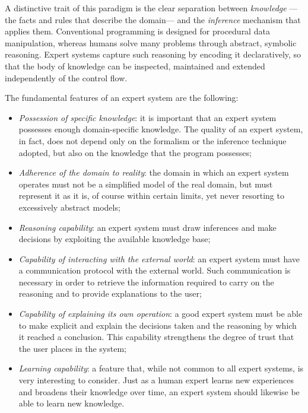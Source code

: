 A distinctive trait of this paradigm is the clear separation between
\emph{knowledge} ---the facts and rules that describe the domain--- and the
\emph{inference} mechanism that applies them. Conventional programming is
designed for procedural data manipulation, whereas humans solve many problems
through abstract, symbolic reasoning. Expert systems capture such reasoning by
encoding it declaratively, so that the body of knowledge can be inspected,
maintained and extended independently of the control flow.

The fundamental features of an expert system are the following:

\begin{itemize}
    \item \emph{Possession of specific knowledge}: it is important that an expert
    system possesses enough domain-specific knowledge. The quality of an expert
    system, in fact, does not depend only on the formalism or the inference
    technique adopted, but also on the knowledge that the program possesses;

    \item \emph{Adherence of the domain to reality}: the domain in which an
    expert system operates must not be a simplified model of the real domain, but
    must represent it as it is, of course within certain limits, yet never
    resorting to excessively abstract models;

    \item \emph{Reasoning capability}: an expert system must draw inferences and
    make decisions by exploiting the available knowledge base;

    \item \emph{Capability of interacting with the external world}: an expert
    system must have a communication protocol with the external world. Such
    communication is necessary in order to retrieve the information required to
    carry on the reasoning and to provide explanations to the user;

    \item \emph{Capability of explaining its own operation}: a good expert system
    must be able to make explicit and explain the decisions taken and the
    reasoning by which it reached a conclusion. This capability strengthens the
    degree of trust that the user places in the system;

    \item \emph{Learning capability}: a feature that, while not common to all
    expert systems, is very interesting to consider. Just as a human expert
    learns new experiences and broadens their knowledge over time, an expert
    system should likewise be able to learn new knowledge.
\end{itemize}


